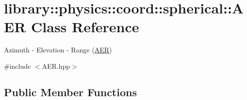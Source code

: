 \hypertarget{classlibrary_1_1physics_1_1coord_1_1spherical_1_1_a_e_r}{}\section{library\+:\+:physics\+:\+:coord\+:\+:spherical\+:\+:A\+ER Class Reference}
\label{classlibrary_1_1physics_1_1coord_1_1spherical_1_1_a_e_r}


Azimuth -\/ Elevation -\/ Range (\hyperlink{classlibrary_1_1physics_1_1coord_1_1spherical_1_1_a_e_r}{A\+ER})  




{\ttfamily \#include $<$A\+E\+R.\+hpp$>$}

\subsection*{Public Member Functions}
